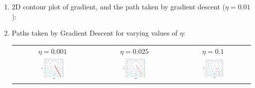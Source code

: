\documentclass[12pt]{article}
\begin{document}
\begin{enumerate}[label=(\alph*)]
    \clearpage

    \item \begin{center}2D contour plot of gradient, and the path taken by gradient descent ($\eta = 0.01$): \end{center}

    \item Paths taken by Gradient Descent for varying values of $\eta$: 
    
    \begin{tabular}{c c c}
        $\eta = 0.001$ & $\eta = 0.025$ & $\eta = 0.1$ \\
        \includegraphics[width=0.3\textwidth]{../Q1/plots/e_contour_001.png} &
        \includegraphics[width=0.3\textwidth]{../Q1/plots/e_contour_025.png} &
        \includegraphics[width=0.3\textwidth]{../Q1/plots/e_contour_1.png} \\
    \end{tabular}


\end{enumerate}
\end{document}
